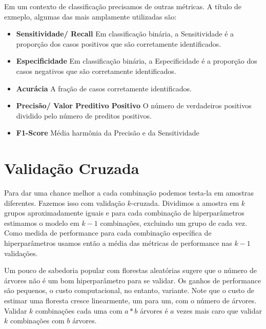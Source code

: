 Em um contexto de classificação precisamos de outras métricas. A título de exmeplo, algumas das mais amplamente utilizadas são:

\begin{itemize}
    \item \textbf{Sensitividade/ Recall} \newline
    Em classificação binária, a Sensitividade é a proporção dos casos positivos que são corretamente identificados.
    \item \textbf{Especificidade} \newline
    Em classificação binária, a Especificidade é a proporção dos casos negativos que são corretamente identificados.
    \item \textbf{Acurácia} \newline
    A fração de casos corretamente identificados. 
    \item \textbf{Precisão/ Valor Preditivo Positivo} \newline
    O número de verdadeiros positivos dividido pelo número de preditos positivos.
    \item \textbf{F1-Score} \newline
    Média harmônia da Precisão e da Sensitividade
    
\end{itemize}


\section{Validação Cruzada}

Para dar uma chance melhor a cada combinação podemos testa-la em amostras diferentes. Fazemos isso com validação $k$-cruzada. Dividimos a amostra em $k$ grupos aproximadamente iguais e para cada combinação de hiperparâmetros estimamos o modelo em $k-1$ combinações, excluindo um grupo de cada vez. Como medida de performance para cada combinação específica de hiperparâmetros usamos então a média das métricas de performance nas $k-1$ validações. 

Um pouco de sabedoria popular com florestas aleatórias sugere que o número de árvores não é um bom hiperparâmetro para se validar. Os ganhos de performance são pequenos, o custo computacional, no entanto, variante. Note que o custo de estimar uma floresta cresce linearmente, um para um, com o número de árvores. Validar $k$ combinações cada uma com $a*b$ árvores é $a$ vezes mais caro que validar $k$ combinações com $b$ árvores. 

